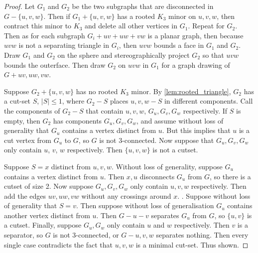 \begin{proof}
	Let $G_1$ and $G_2$ be the two subgraphs that are disconnected in $G - \{u,v,w\}$. Then if $G_1 + \{u,v,w\}$ has a rooted $K_3$ minor on $u,v,w$, then contract this minor to $K_3$ and delete all other vertices in $G_1$. Repeat for $G_2$. Then as for each subgraph $G_i + uv + uw + vw$ is a planar graph, then because $uvw$ is not a separating triangle in $G_i$, then $uvw$ bounds a face in $G_1$ and $G_2$. Draw $G_1$ and $G_2$ on the sphere and stereographically project $G_2$ so that $uvw$ bounds the outerface. Then draw $G_2$ on $uvw$ in $G_1$ for a graph drawing of $G + uv, uw, vw$. 
	
	Suppose $G_2 + \{u,v,w\}$ has no rooted $K_3$ minor. By \cref{lem:rooted_triangle}, $G_2$ has a cut-set $S$, $|S| \leq 1$, where $G_2 - S$ places $u,v,w - S$ in different components. Call the components of $G_2 - S$ that contain $u,v,w$, $G_u, G_v, G_w$ respectively. If $S$ is empty, then $G_2$ has components $G_u, G_v, G_w$, and assume without loss of generality that $G_u$ contains a vertex distinct from $u$. But this implies that $u$ is a cut vertex from $G_u$ to $G$, so $G$ is not $3$-connected. Now suppose that $G_u,G_v, G_w$ only contain $u$, $v$, $w$ respectively. Then $\{u,v,w\}$ is not a cutset. 
	
	Suppose $S = x$ distinct from $u,v,w$. Without loss of generality, suppose $G_u$ contains a vertex distinct from $u$. Then $x, u$ disconnects $G_u$ from $G$, so there is a cutset of size 2. Now suppose $G_u, G_v, G_w$ only contain $u,v,w$ respectively. Then add the edges $uv, uw, vw$ without any crossings around $x$. . Suppose without loss of generality that $S = v$. Then suppose without loss of generalisation $G_u$ contains another vertex distinct from $u$. Then $G - u - v$ separates $G_u$ from $G$, so $\{u,v\}$ is a cutset. Finally, suppose $G_u, G_w$ only contain $u$ and $w$ respectively. Then $v$ is a separator, so $G$ is not $3$-connected, or $G - u,v,w$ separates nothing. Then every single case contradicts the fact that $u,v,w$ is a minimal cut-set. Thus shown.
\end{proof}

